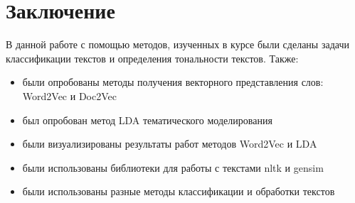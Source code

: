 \documentclass[12pt, a4paper]{article}
\begin{document}
    \section{Заключение}
        В данной работе с помощью методов, изученных в курсе были сделаны задачи классификации текстов и определения тональности текстов. Также:
        \begin{itemize}
            \item были опробованы методы получения векторного представления слов: Word2Vec и Doc2Vec
            \item был опробован метод LDA тематического моделирования
            \item были визуализированы результаты работ методов Word2Vec и LDA
            \item были использованы библиотеки для работы с текстами nltk и gensim
            \item были использованы разные методы классификации и обработки текстов
        \end{itemize}
\end{document}
